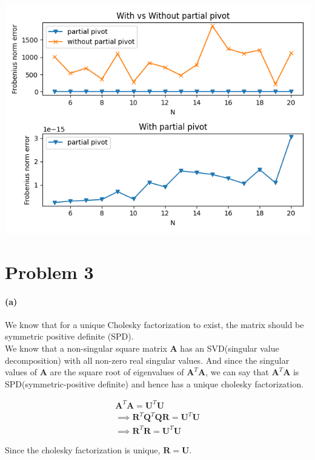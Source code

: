 \documentclass[12pt, letterpaper]{article}
\begin{document}
\includegraphics{2}

\pagebreak
\section*{Problem 3}
\label{sec:prob3}

\paragraph{(a)} 

We know that for a unique Cholesky factorization to exist, the matrix should be symmetric positive definite (SPD).\\

We know that a non-singular square matrix $\mathbf{A}$ has an SVD(singular value decomposition) with all non-zero real singular values. And since the singular values of $\mathbf{A}$ are the square root of eigenvalues of $\mathbf{A}^T\mathbf{A}$, we can say that $\mathbf{A}^T\mathbf{A}$ is SPD(symmetric-positive definite) and hence has a unique cholesky factorization.

\begin{align*}
  \mathbf{A}^T\mathbf{A} = \mathbf{U}^T\mathbf{U} \\
  \implies \mathbf{R}^T\mathbf{Q}^T\mathbf{Q}\mathbf{R} = \mathbf{U}^T\mathbf{U} \\
  \implies \mathbf{R}^T\mathbf{R} = \mathbf{U}^T\mathbf{U}
\end{align*}

Since the cholesky factorization is unique, $\mathbf{R} = \mathbf{U}$.
\end{document}
